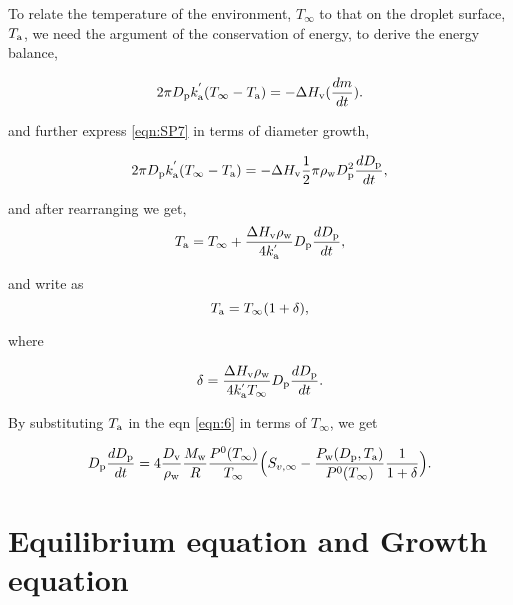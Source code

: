 \documentclass[12pt]{article}
\begin{document}
To relate the temperature of the environment, $T_{\infty}$ to that on the droplet surface, $T_{\rm a}$, we need the argument of the conservation of energy, to derive the energy balance,

\begin{equation}\label{eqn:SP7}
2 \pi D_{\rm p} k^{'}_{\rm a} (T_{\infty}-T_{\rm a})= -\Delta H_{\rm v}(\frac{dm}{dt}).
\end{equation}

and further express \ref{eqn:SP7} in terms of diameter growth, 

\begin{equation}\label{eqn:SP8}
2 \pi D_{\rm p} k^{'}_{\rm a} (T_{\infty}-T_{\rm a})= -\Delta H_{\rm v} \frac{1}{2} \pi \rho_{\rm w} D_{\rm p}^{2} \frac{dD_{\rm p}}{dt},
\end{equation}

and after rearranging we get, 
\begin{equation}\label{eqn:SP9}
T_{\rm a}= T_{\infty} + \frac{\Delta H_{\rm v}  \rho_{\rm w}}{4 k^{'}_{\rm a}} D_{\rm p} \frac{dD_{\rm p}}{dt},
\end{equation}

and write as 
\begin{equation}\label{eqn:SP10}
T_{\rm a}=T_{\infty}(1+\delta),
\end{equation}

where 

\begin{equation}\label{eqn:SP11}
\delta= \frac{\Delta H_{\rm v}  \rho_{\rm w}}{4 k^{'}_{\rm a}T_{\infty}} D_{\rm p} \frac{dD_{\rm p}}{dt}.
\end{equation}

By substituting $T_{\rm a}$ in the eqn \ref{eqn:6} in terms of $T_{\infty}$, we get 


\begin{equation}\label{eqn:SP12}
D_{\rm p}\frac{dD_{\rm p}}{dt}=4 \frac{D_{\rm v}} {\rho_{\rm w}} \frac{M_{\rm w}}{R} \frac{P^{\rm 0}(T_{\infty})} {T_{\infty}} \Big(S_{v, \infty} - \frac{P_{\rm w}(D_{\rm p}, T_{\rm a})}{P^{\rm 0}(T_{\infty})} \frac{1}{1+\delta}\Big).
\end{equation}



\section{Equilibrium equation and Growth equation}
\end{document}
